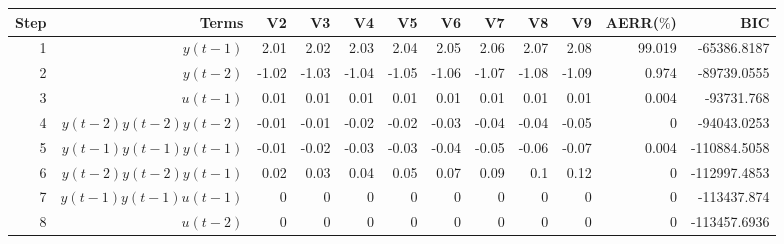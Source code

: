 \begin{tabular}{rrrrrrrrrrrr}
Step & Terms & V2 & V3 & V4 & V5 & V6 & V7 & V8 & V9 & AERR($\%$) & BIC \\ 
\hline 
1 & $y(t-1)$ & 2.01 & 2.02 & 2.03 & 2.04 & 2.05 & 2.06 & 2.07 & 2.08 & 99.019 & -65386.8187 \\ 
2 & $y(t-2)$ & -1.02 & -1.03 & -1.04 & -1.05 & -1.06 & -1.07 & -1.08 & -1.09 & 0.974 & -89739.0555 \\ 
3 & $u(t-1)$ & 0.01 & 0.01 & 0.01 & 0.01 & 0.01 & 0.01 & 0.01 & 0.01 & 0.004 & -93731.768 \\ 
4 & $y(t-2)y(t-2)y(t-2)$ & -0.01 & -0.01 & -0.02 & -0.02 & -0.03 & -0.04 & -0.04 & -0.05 & 0 & -94043.0253 \\ 
5 & $y(t-1)y(t-1)y(t-1)$ & -0.01 & -0.02 & -0.03 & -0.03 & -0.04 & -0.05 & -0.06 & -0.07 & 0.004 & -110884.5058 \\ 
6 & $y(t-2)y(t-2)y(t-1)$ & 0.02 & 0.03 & 0.04 & 0.05 & 0.07 & 0.09 & 0.1 & 0.12 & 0 & -112997.4853 \\ 
7 & $y(t-1)y(t-1)u(t-1)$ & 0 & 0 & 0 & 0 & 0 & 0 & 0 & 0 & 0 & -113437.874 \\ 
8 & $u(t-2)$ & 0 & 0 & 0 & 0 & 0 & 0 & 0 & 0 & 0 & -113457.6936 \\ 
\hline 
\end{tabular}